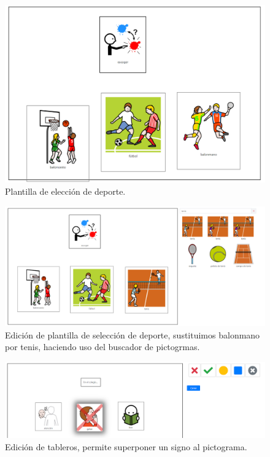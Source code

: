 	\begin{figure}[h!]
		\centering
		\includegraphics[width=0.7\linewidth]{Imagenes/Bitmap/pictableros1}
		\caption{Plantilla de elección de deporte.}
		\label{fig:pictableros1}
	\end{figure}
	
	
	\begin{figure}[h!]
		\centering
		\includegraphics[width=0.7\linewidth]{Imagenes/Bitmap/pictableros2}
		\caption[Edición de plantilla en Pictableros]{Edición de plantilla de selección de deporte, sustituimos balonmano por tenis, haciendo uso del buscador de pictogrmas.}
		\label{fig:pictableros2}
	\end{figure}
	
	\begin{figure}[h!]
		\centering
		\includegraphics[width=0.7\linewidth]{Imagenes/Bitmap/pictableros3}
		\caption[Edición plantilla en Pictableros]{Edición de tableros, permite superponer un signo al pictograma.}
		\label{fig:pictableros3}
	\end{figure}
	

